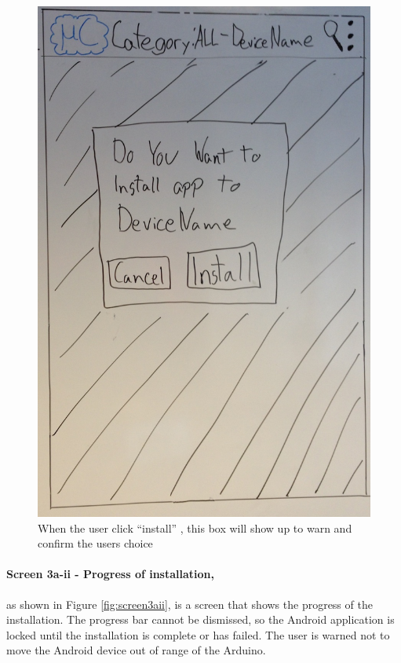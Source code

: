 \begin{figure}[H]
\centering
\includegraphics[scale=0.2]{images/Design_guide/Screen3a-i.png}
\caption[Screen 3a-i - Installation confirmation]{When the user click ``install'' , this box will show up to warn and confirm the users choice}
\label{fig:screen3ai}
\end{figure}


\paragraph{Screen 3a-ii - Progress of installation,} as shown in Figure \ref{fig:screen3aii}, is a screen that shows the progress of the installation. The progress bar cannot be dismissed, so the Android application is locked until the installation is complete or has failed.
The user is warned not to move the Android device out of range of the Arduino.


